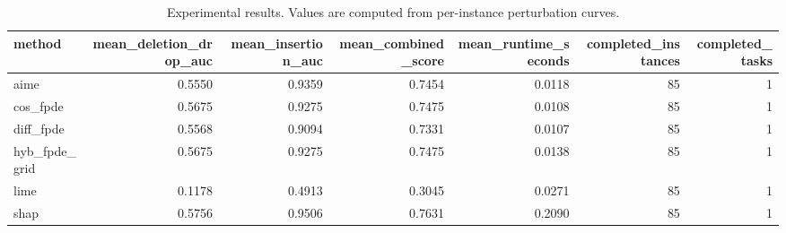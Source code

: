 \begin{table}[t]
\caption{Experimental results. Values are computed from per-instance perturbation curves.}
\label{tab:main_results_computed}
\centering
\begin{tabular}{lrrrrrr}
\toprule
method & mean\_deletion\_drop\_auc & mean\_insertion\_auc & mean\_combined\_score & mean\_runtime\_seconds & completed\_instances & completed\_tasks \\
\midrule
aime & 0.5550 & 0.9359 & 0.7454 & 0.0118 & 85 & 1 \\
cos\_fpde & 0.5675 & 0.9275 & 0.7475 & 0.0108 & 85 & 1 \\
diff\_fpde & 0.5568 & 0.9094 & 0.7331 & 0.0107 & 85 & 1 \\
hyb\_fpde\_grid & 0.5675 & 0.9275 & 0.7475 & 0.0138 & 85 & 1 \\
lime & 0.1178 & 0.4913 & 0.3045 & 0.0271 & 85 & 1 \\
shap & 0.5756 & 0.9506 & 0.7631 & 0.2090 & 85 & 1 \\
\bottomrule
\end{tabular}

\end{table}
